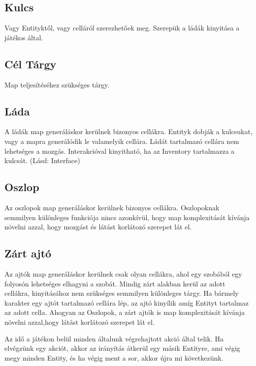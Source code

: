 \subsection{Kulcs}

Vagy Entityktől, vagy celláról szerezhetőek meg.
Szerepük a ládák kinyitása a játékos által.

\subsection{Cél Tárgy}

Map teljesítéséhez szükséges tárgy.


\subsection{Láda}

A ládák map generáláskor kerülnek bizonyos cellákra.
Entityk dobják a kulcsukat, vagy a mapra generálódik le valamelyik cellára.
Ládát tartalmazó cellára nem lehetséges a mozgás.
Interakcióval kinyitható, ha az Inventory tartalmazza a kulcsát. (Lásd: Interface)

\subsection{Oszlop}

Az oszlopok map generáláskor kerülnek bizonyos cellákra.
Oszlopoknak semmilyen különleges funkciója nincs azonkívül, hogy map komplexitását kívánja növelni azzal,
hogy mozgást és látást korlátozó szerepet lát el.

\subsection{Zárt ajtó}

Az ajtók map generáláskor kerülnek csak olyan cellákra, ahol egy szobából egy folyosón lehetséges elhagyni a szobát.
Mindig zárt alakban kerül az adott cellákra, kinyitásához nem szükséges semmilyen különleges tárgy. Ha bármely karakter egy ajtót tartalmazó cellára lép, az ajtó kinyílik amíg Entityt tartalmaz az adott cella.
Ahogyan az Oszlopok, a zárt ajtók is map komplexitását kívánja növelni azzal,hogy látást korlátozó szerepet lát el.


Az idő a játékon belül minden általunk végrehajtott akció által telik.
Ha elvégzünk egy akciót, akkor az irányítás átkerül egy másik Entityre,
ami végig megy minden Entity, és ha végig ment a sor, akkor újra mi következünk.

